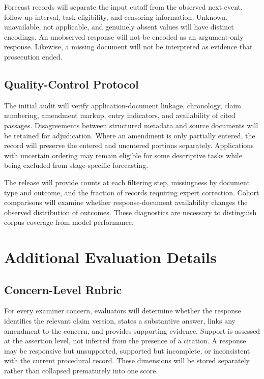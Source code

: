 \documentclass[11pt]{article}
\begin{document}
Forecast records will separate the input cutoff from the observed next event, follow-up interval, task eligibility, and censoring information. Unknown, unavailable, not applicable, and genuinely absent values will have distinct encodings. An unobserved response will not be encoded as an argument-only response. Likewise, a missing document will not be interpreted as evidence that prosecution ended.

\subsection{Quality-Control Protocol}
\label{sec:appendix-quality}

The initial audit will verify application-document linkage, chronology, claim numbering, amendment markup, entry indicators, and availability of cited passages. Disagreements between structured metadata and source documents will be retained for adjudication. Where an amendment is only partially entered, the record will preserve the entered and unentered portions separately. Applications with uncertain ordering may remain eligible for some descriptive tasks while being excluded from stage-specific forecasting.

The release will provide counts at each filtering step, missingness by document type and outcome, and the fraction of records requiring expert correction. Cohort comparisons will examine whether response-document availability changes the observed distribution of outcomes. These diagnostics are necessary to distinguish corpus coverage from model performance.

\section{Additional Evaluation Details}
\label{sec:appendix-add-results}

\subsection{Concern-Level Rubric}
\label{sec:appendix-rubric}

For every examiner concern, evaluators will determine whether the response identifies the relevant claim version, states a substantive answer, links any amendment to the concern, and provides supporting evidence. Support is assessed at the assertion level, not inferred from the presence of a citation. A response may be responsive but unsupported, supported but incomplete, or inconsistent with the current procedural record. These dimensions will be stored separately rather than collapsed prematurely into one score.
\end{document}
